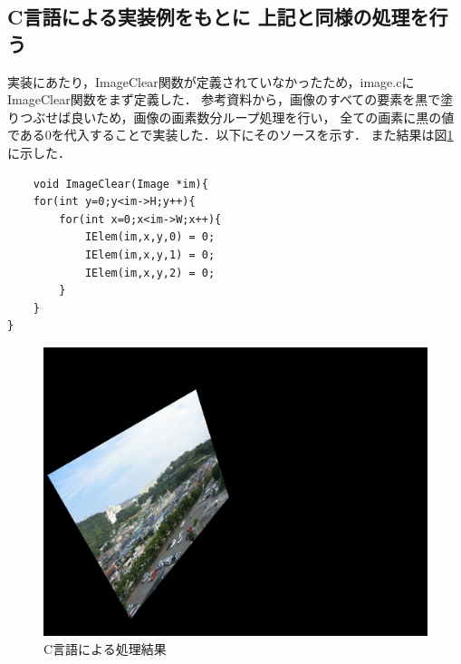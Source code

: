 \documentclass[11pt]{jarticle}
\begin{document}
\subsection{C言語による実装例をもとに 上記と同様の処理を行う}
実装にあたり，ImageClear関数が定義されていなかったため，image.cにImageClear関数をまず定義した．
参考資料から，画像のすべての要素を黒で塗りつぶせば良いため，画像の画素数分ループ処理を行い，
全ての画素に黒の値である0を代入することで実装した．以下にそのソースを示す．
また結果は図\ref{2-3.jpg}に示した．

\begin{verbatim}
    void ImageClear(Image *im){
    for(int y=0;y<im->H;y++){
        for(int x=0;x<im->W;x++){
            IElem(im,x,y,0) = 0;
            IElem(im,x,y,1) = 0;
            IElem(im,x,y,2) = 0;
        }
    }
}
\end{verbatim}
\begin{figure}[h]
    \centering
    \includegraphics[scale=.15]{2-3.jpg}
    \caption{C言語による処理結果}
    \label{2-3.jpg}
\end{figure}
\end{document}
